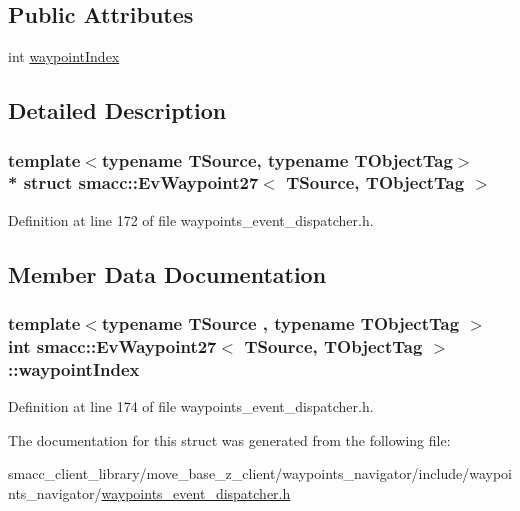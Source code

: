 \subsection*{Public Attributes}
\begin{DoxyCompactItemize}
\item 
int \hyperlink{structsmacc_1_1EvWaypoint27_ac597b7c1761748e1af3faa82449e0051}{waypoint\+Index}
\end{DoxyCompactItemize}


\subsection{Detailed Description}
\subsubsection*{template$<$typename T\+Source, typename T\+Object\+Tag$>$\\*
struct smacc\+::\+Ev\+Waypoint27$<$ T\+Source, T\+Object\+Tag $>$}



Definition at line 172 of file waypoints\+\_\+event\+\_\+dispatcher.\+h.



\subsection{Member Data Documentation}
\subsubsection[{\texorpdfstring{waypoint\+Index}{waypointIndex}}]{\setlength{\rightskip}{0pt plus 5cm}template$<$typename T\+Source , typename T\+Object\+Tag $>$ int {\bf smacc\+::\+Ev\+Waypoint27}$<$ T\+Source, T\+Object\+Tag $>$\+::waypoint\+Index}\hypertarget{structsmacc_1_1EvWaypoint27_ac597b7c1761748e1af3faa82449e0051}{}\label{structsmacc_1_1EvWaypoint27_ac597b7c1761748e1af3faa82449e0051}


Definition at line 174 of file waypoints\+\_\+event\+\_\+dispatcher.\+h.



The documentation for this struct was generated from the following file\+:\begin{DoxyCompactItemize}
\item 
smacc\+\_\+client\+\_\+library/move\+\_\+base\+\_\+z\+\_\+client/waypoints\+\_\+navigator/include/waypoints\+\_\+navigator/\hyperlink{waypoints__event__dispatcher_8h}{waypoints\+\_\+event\+\_\+dispatcher.\+h}\end{DoxyCompactItemize}
